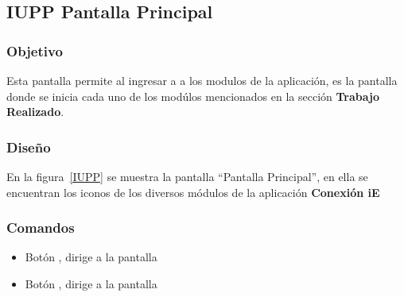 \subsection{IUPP  Pantalla Principal}

\subsubsection{Objetivo}

	
    Esta pantalla permite al  ingresar a a los modulos de la aplicación, es la pantalla donde se inicia cada uno de los modúlos mencionados en la sección \textbf{Trabajo Realizado}.
\subsubsection{Diseño}


    En la figura~\ref{IUPP} se muestra la pantalla ``Pantalla Principal'', en ella se encuentran los iconos de los diversos módulos de la aplicación \textbf{Conexión iE}



\subsubsection{Comandos}
    \begin{itemize}

	\item Botón \botSalones, dirige a la pantalla 
	\item Botón \botProfesores, dirige a la pantalla 
    \end{itemize}
